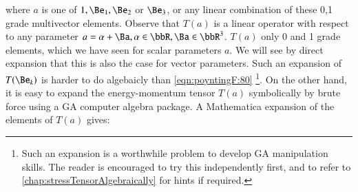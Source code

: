 where \( a \) is one of \( 1, \Be_1, \Be_2 \) or \( \Be_3 \), or any linear combination of these 0,1 grade multivector elements.  Observe that \( T(a) \) is a linear operator with respect to any parameter \( a = \alpha + \Ba, \alpha \in \bbR, \Ba \in \bbR^3 \).  \( T(a) \) only 0 and 1 grade elements, which we have seen for scalar parameters \( a \).  We will see by direct expansion that this is also the case for vector parameters.
Such an expansion of \( T(\Be_k) \) is harder to do algebaicly than \cref{eqn:poyntingF:80}
\footnote{Such an expansion is a worthwhile problem to develop GA manipulation skills.  The reader is encouraged to try this independently first, and to refer to
\cref{chap:stressTensorAlgebraically}
for hints if required.}.
On the other hand, it is easy to expand the energy-momentum tensor \( T(a) \) symbolically by brute force using a GA computer algebra package.
A Mathematica expansion of the elements of \( T(a) \) gives:


